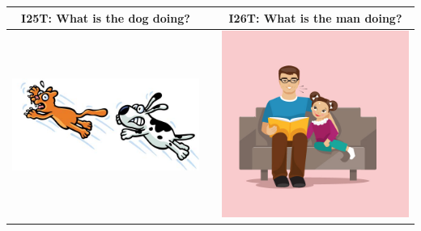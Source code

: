 \documentclass[12pt,notitlepage]{article}
\begin{document}
\begin{center}
\begin{tabular}{|c|c|c|}
\hline
I25T: What is the dog doing? && I26T: What is the man doing? \\
\hline
\includegraphics[width=20em,trim=0 0 0 -3]{figures/I25.jpg} & & \includegraphics[width=20em,trim=0 0 0 -3]{figures/I26.jpg} \\
\hline
\end{tabular}
\vspace{1em} \\



\end{center}
\end{document}

